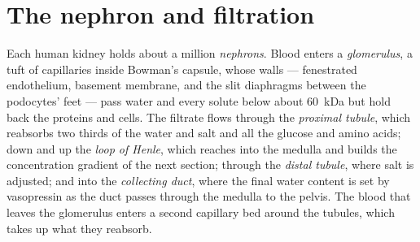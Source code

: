 \section{The nephron and filtration}

\begin{definition}\label{def:b3:renal-osmoregulation:nephron}
Each human kidney holds about a million \emph{nephrons}. Blood enters
a \emph{glomerulus}, a tuft of capillaries inside Bowman's capsule, whose
walls --- fenestrated endothelium, basement membrane, and the slit
diaphragms between the podocytes' feet --- pass water and every solute
below about \qty{60}{kDa} but hold back the proteins and cells. The
filtrate flows through the \emph{proximal tubule}, which reabsorbs two
thirds of the water and salt and all the glucose and amino acids; down
and up the \emph{loop of Henle}, which reaches into the medulla and
builds the concentration gradient of the next section; through the
\emph{distal tubule}, where salt is adjusted; and into the
\emph{collecting duct}, where the final water content is set by
vasopressin as the duct passes through the medulla to the pelvis. The
blood that leaves the glomerulus enters a second capillary bed around
the tubules, which takes up what they reabsorb.
\end{definition}

